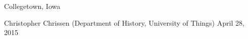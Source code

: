 

\vspace{1ex}

\begin{changemargin}{-0.3in}{0in}
\begin{etaremune}
%

\item
\headedsection %
{}
{Collegetown, Iowa} {

\headedsubsection %
{Christopher Chrissen \textnormal{(Department of History, University
    of Things)}}
{April 28, 2015}
{}
}

\end{etaremune}
\end{changemargin}


\spacedhrule{0.5em}{-0.4em} %

